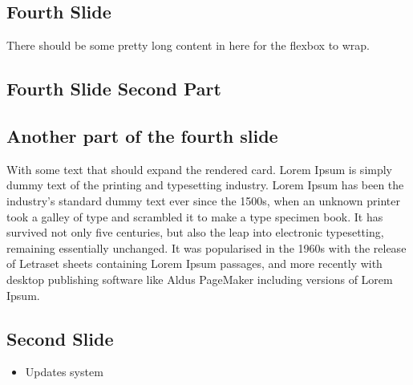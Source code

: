 \documentclass[ 6pt, a4paper, landscape ]{scrartcl}
\begin{document}
\begin{multicols}{4}
\begin{breakbox}
	\end{breakbox}
	
	\begin{breakbox}
		\section{Fourth Slide}
There should be some pretty long content in here for the flexbox to wrap.

	\end{breakbox}
	
	\begin{breakbox}
		\section{Fourth Slide Second Part}
	\end{breakbox}
	
	\begin{breakbox}
		\section{Another part of the fourth slide}
With some text that should expand the rendered card. Lorem Ipsum is simply dummy
text of the printing and typesetting industry. Lorem Ipsum has been the
industry’s standard dummy text ever since the 1500s, when an unknown printer
took a galley of type and scrambled it to make a type specimen book. It has
survived not only five centuries, but also the leap into electronic typesetting,
remaining essentially unchanged. It was popularised in the 1960s with the
release of Letraset sheets containing Lorem Ipsum passages, and more recently
with desktop publishing software like Aldus PageMaker including versions of
Lorem Ipsum.

	\end{breakbox}
	
	\begin{breakbox}
		\section{Second Slide}
\begin{itemize}
\item Updates system\end{itemize}

\end{breakbox}
\end{multicols}
\end{document}
